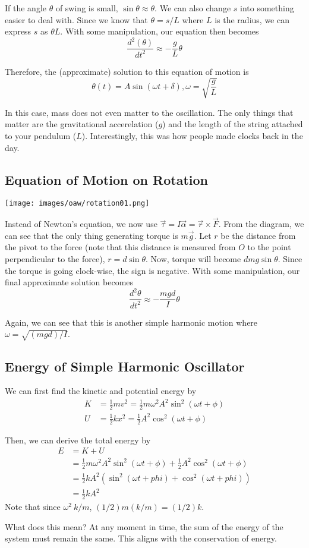 If the angle $\theta$ of swing is small, $\sin\theta \approx \theta$. We can also change $s$ into 
something easier to deal with. Since we know that $\theta = s/L$ where $L$ is the radius, we can
express $s$ as $\theta L$. With some manipulation, our equation then becomes
\[ \frac{d^2(\theta)}{dt^2} \approx -\frac{g}{L}\theta \]

Therefore, the (approximate) solution to this equation of motion is
\[ \theta(t) = A\sin(\omega t + \delta), \omega = \sqrt{\frac{g}{L}} \]

In this case, mass does not even matter to the oscillation. The only things that matter are the 
gravitational accerelation ($g$) and the length of the string attached to your pendulum ($L$).
Interestingly, this was how people made clocks back in the day.

\subsection{Equation of Motion on Rotation}

\begin{center}
\texttt{[image: images/oaw/rotation01.png]}
\end{center}

Instead of Newton's equation, we now use $\vec{\tau} = I\vec{\alpha} = \vec{r}\times\vec{F}$.
From the diagram, we can see that the only thing generating torque is $m\vec{g}$. Let $r$ be the
distance from the pivot to the force (note that this distance is measured from $O$ to the point
perpendicular to the force), $r = d\sin\theta$. Now, torque will become $dmg\sin\theta$. Since
the torque is going clock-wise, the sign is negative. With some manipulation, our final 
approximate solution becomes
\[ \frac{d^2\theta}{dt^2} \approx -\frac{mgd}{I}\theta \]

Again, we can see that this is another simple harmonic motion where $\omega = \sqrt{(mgd)/I}$.

\subsection{Energy of Simple Harmonic Oscillator}

We can first find the kinetic and potential energy by
\begin{align*}
    K &= \frac{1}{2}mv^2 = \frac{1}{2}m\omega^2A^2\sin^2(\omega t + \phi)\\
    U &= \frac{1}{2}kx^2 = \frac{1}{2}A^2\cos^2(\omega t + \phi)
\end{align*}

Then, we can derive the total energy by
\begin{align*}
    E &= K + U\\
    &= \frac{1}{2}m\omega^2A^2\sin^2(\omega t + \phi) + \frac{1}{2}A^2\cos^2(\omega t + \phi)\\
    &= \frac{1}{2}kA^2 ( \sin^2(\omega t + phi) + \cos^2(\omega t + phi))\\
    &= \frac{1}{2}kA^2
\end{align*}
Note that since $\omega^2 \ k / m$, $(1/2)m(k/m) = (1/2)k$.

What does this mean? At any moment in time, the sum of the energy of the system must remain the same.
This aligns with the conservation of energy.